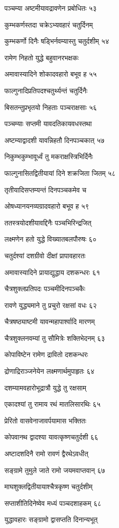 पञ्चम्या अष्टमीयावद्रावणेन प्रबोधितः ५३

कुम्भकर्णस्तदा चक्रेऽभ्यवहारं चतुर्दिनम्

कुम्भकर्णो दिनैः षड्भिर्नवम्यास्तु चतुर्दशीम् ५४

रामेण निहतो युद्धे बहुवानरभक्षकः

अमावास्यादिने शोकादवहारो बभूव ह ५५

फाल्गुनादिप्रतिपदश्चतुर्थ्यन्तं चतुर्दिनैः

बिसतन्तुप्रभृतयो निहताः पञ्चराक्षसाः ५६

पञ्चम्याः सप्तमी यावदतिकायवधस्तथा

अष्टम्याद्वादशी यावन्निहतौ दिनपञ्चकात् ५७

निकुम्भकुम्भावूर्ध्वं तु मकराक्षस्त्रिभिर्दिनैः

फाल्गुनासितद्वितीयायां दिने शक्रजिता जितम् ५८

तृतीयादिसप्तम्यन्तं दिनपञ्चकमेव च

ओषध्यानयनव्यग्रादवहारो बभूव ह ५९

ततस्त्रयोदशीयावद्दिनैः पञ्चभिरिन्द्रजित्

लक्ष्मणेन हतो युद्धे विख्यातबलपौरुषः ६०

चतुर्दश्यां दशग्रीवो दीक्षां प्रापावहारतः

अमावास्यादिने प्रायाद्युद्धाय दशकन्धरः ६१

चैत्रशुक्लप्रतिपदः पञ्चमीदिनपञ्चकैः

रावणे युद्ध्यमाने तु प्रचुरो रक्षसां वधः ६२

चैत्रषष्ठ्याष्टमी यावन्महापार्श्वादि मारणम्

चैत्रशुक्लनवम्यां तु सौमित्रेः शक्तिभेदनम् ६३

कोपाविष्टेन रामेण द्रावितो दशकन्धरः

द्रोणाद्रिराञ्जनेयेन लक्ष्मणार्थमुपाहृतः ६४

दशम्यामवहारोभूद्रात्रौ युद्धे तु रक्षसाम्

एकादश्यां तु रामाय रथं मातलिसारथिः ६५

प्रेरितो वासवेनाजावर्पयामास भक्तितः

कोपवानथ द्वादश्या यावत्कृष्णचतुर्दशी ६६

अष्टादशदिनै रामो रावणं द्वैरथेऽवधीत्

सङ्ग्रामे तुमुले जाते रामो जयमवाप्तवान् ६७

माघशुक्लद्वितीयायाश्चैत्रकृष्ण चतुर्दशीम्

सप्ताशीतिदिनेष्वेव मध्यं पञ्चदशाहकम् ६८

युद्धावहारः सङ्ग्रामो द्वासप्तति दिनान्यभूत्

